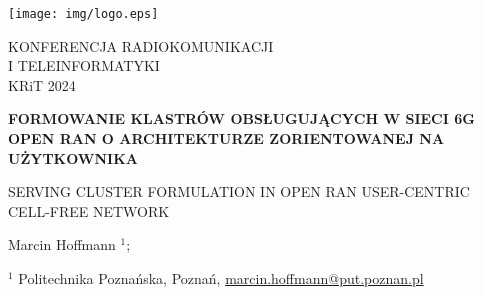 \documentclass[a4paper]{article}
\newcommand{\titlePL}[1]{\large\textbf{ #1}}
\newcommand{\titleEN}[1]{\normalsize #1}
\begin{document}
\thispagestyle{empty}\pagestyle{fancy}
\begin{minipage}[t]{0.5\textwidth}\vspace{0pt}%
\texttt{[image: img/logo.eps]}
\end{minipage}
\begin{minipage}[t]{0.45\textwidth}\vspace{12pt}%
\centering
\color{logo_color} KONFERENCJA RADIOKOMUNIKACJI\\ I TELEINFORMATYKI\\ KRiT 2024
\end{minipage}

\vspace{1cm}

\begin{center}
\titlePL{FORMOWANIE KLASTRÓW OBSŁUGUJĄCYCH W SIECI 6G OPEN RAN O ARCHITEKTURZE ZORIENTOWANEJ NA UŻYTKOWNIKA}


\titleEN{SERVING CLUSTER FORMULATION IN OPEN RAN USER-CENTRIC CELL-FREE NETWORK}\medskip

Marcin Hoffmann $^{1}$;

\medskip

\begin{minipage}[t]{0.6\textwidth}
\small $^{1}$ Politechnika Poznańska, Poznań, \href{mailto:email}{marcin.hoffmann@put.poznan.pl}\\
\end{minipage}


\end{center}

\medskip
\end{document}
